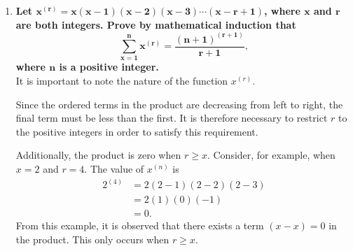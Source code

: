 \documentclass[12pt]{article}
\begin{document}
\begin{enumerate}
    Now we will factorise the polynomial $f(k) = k^3 + 3k^2 + 3k + 2$. Notice that
    \begin{align*}
        f(-2) &= (-2)^3 + 3(-2)^2 + 3(-2) + 2 \\
        &= -8 + 12 - 6 + 2 \\
        &= 0.
    \end{align*}
    Hence, by the remainder theorem, $(k + 2)$ is a factor of $f(k)$. Dividing $f(k)$ by $(k + 2)$, we obtain the other factor, which is $k^2 + k + 1$. Therefore,
    \begin{equation*}
        k^3 + 3k^2 + 3k + 2 = (k + 2)(k^2 + k + 1).
    \end{equation*}

    Substituting this into the $\text{LHS}$, we get
    \begin{align*}
        \text{LHS} &= \frac{(k + 1)(k + 2)(k^2 + k + 1)}{2(k^2 + 3k + 3)(k^2 + k + 1)} \\
        &= \frac{(k + 1)(k + 2)}{2(k^2 + 3k + 3)} \\
        &= \text{RHS}.
    \end{align*}

    The result is thus true for $n = k + 1$. But it is true for $n = 1$, hence it is also true for all positive integer values of $n$.

    \item {\bf Let $\mathbf{x^{(r)} = x(x - 1)(x - 2)(x - 3)\cdots(x - r + 1)}$, where $\mathbf{x}$ and $\mathbf{r}$ are both integers. Prove by mathematical induction that
    \begin{equation*}
        \mathbf{\sum_{x = 1}^n x^{(r)} = \frac{(n + 1)^{(r + 1)}}{r + 1},}
    \end{equation*}
    where $\mathbf{n}$ is a positive integer.} \\

    It is important to note the nature of the function $x^{(r)}$.

    Since the ordered terms in the product are decreasing from left to right, the final term must be less than the first. It is therefore necessary to restrict $r$ to the positive integers in order to satisfy this requirement.

    Additionally, the product is zero when $r \ge x$. Consider, for example, when $x = 2$ and $r = 4$. The value of $x^{(n)}$ is
    \begin{align*}
        2^{(4)} &= 2(2 - 1)(2 - 2)(2 - 3) \\
        &= 2(1)(0)(-1) \\
        &= 0.
    \end{align*}
    From this example, it is observed that there exists a term $(x - x) = 0$ in the product. This only occurs when $r \ge x$.


\end{enumerate}
\end{document}
